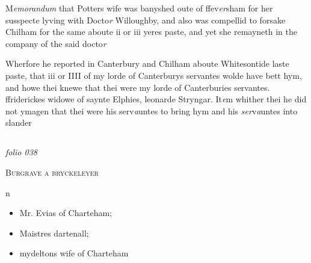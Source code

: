 \documentclass[12pt, a4paper]{book}
\begin{document}
		\ifthenelse{\isodd{\thepage}}
		{\reversemarginpar}
		{\normalmarginpar}
		 M\textit{emorandum} that Potters wife was banyshed oute of ffev\textit{er}sham for
 		her susspecte lyving with Docto\textit{r} Willoughby, and also was
 		compellid to forsake Chilham for the same aboute ii or iii
 		yeres paste, and yet she remayneth in the company of
 		the said docto\textit{r}
 

	
		\ifthenelse{\isodd{\thepage}}
		{\reversemarginpar}
		{\normalmarginpar}
		Wherfore he reported in Canterbury and Chilham aboute
		Whitesontide laste paste, that iii or IIII of
			 my lorde of Canterburys
 servantes wolde have bett hym, and howe thei knewe that thei
 were my lorde of Canterburies servantes. ffriderickes widowe
 of saynte Elphies, leonarde Stryngar.
 It\textit{e}m whither thei he did not ymagen that thei were his serv\textit{a}untes
 to bring hym and his \textit{ser}v\textit{a}untes into slander


            
\dotfill
						\newpage {} \subsection*{}

\textit{folio 038}


            

				\begin{center} \begin{large} {\scshape Burgrave a bryckeleyer} \end{large} \end{center}
			
 n
 	\begin{itemize}
 		\item[]Mr. Evias of Charteham;
 		\item[]Maistres dartenall;
 		\item[]mydeltons wife of Charteham
 	\end{itemize}
			
 

            

	
				\marginpar[\vspace{0.5cm}{\textcolor{Gray}{n}}]{}
			
\end{document}
